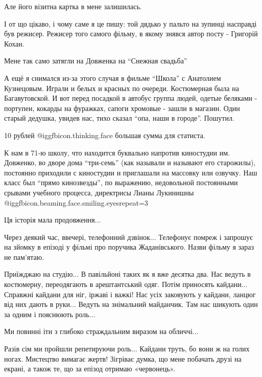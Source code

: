 \begin{itemize}
Але його візитна картка в мене залишилась.

І от що цікаво, і чому саме я це пишу: той дядько у пальто на зупинці насправді
був режисер. Режисер того самого фільму, в якому знявся автор посту - Григорій
Кохан.

Мене так само затягли на Довженка на \enquote{Снежная свадьба}

\begin{itemize} %

А ещё я снимался из-за этого случая в фильме \enquote{Школа} с Анатолием Кузнецовым.
Играли и белых и красных по очереди. Костюмерная была на Багавутовской. И вот
перед посадкой в автобус группа людей, одетые беляками - портупеи, кокарды на
фуражках, сапоги хромовые - зашли в магазин. Один старый дедушка, увидев нас,
тихо сказал \enquote{опа, наши в городе}. Пошутил.

\end{itemize} %

10 рублей @igg{fbicon.thinking.face}  большая сумма для статиста.


К нам в 71-ю школу, что находится буквально напротив киностудии им. Довженко,
во дворе дома \enquote{три-семь} (как называли и называют его старожилы), постоянно
приходили с киностудии и приглашали на массовку или озвучку. Наш класс был
\enquote{прямо кинозвезды}, по выражению, недовольной постоянными срывами учебного
процесса, директрисы Лианы Лукинишны @igg{fbicon.beaming.face.smiling.eyes}{repeat=3} 


Ця історія мала продовження...

Через деякий час, ввечері, телефонний дзвінок... Телефонує помреж і запрошує на
зйомку в епізоді у фільмі про поручика Жаданівського. Назви фільму я зараз не
пам’ятаю.

Приїжджаю на студію... В павільйоні таких як я вже десятка два. Нас ведуть в
костюмерну, переодягають в арештантський одяг. Потім приносять кайдани...
Справжні кайдани для ніг, іржаві і важкі! Нас усіх заковують у кайдани, ланцюг
від них дають в руки... Ведуть на знімальний майданчик. Там нас шикують один за
одним і пояснюють роль...

Ми повинні іти з глибоко страждальним виразом на обличчі...

Разів сім ми пройшли репетируючи роль... Кайдани труть, бо вони ж на голих ногах.
Мистецтво вимагає жертв! Зігріває думка, що мене побачать друзі на екрані, а
також те, що за епізод отримаю «червонець».


\end{itemize}
